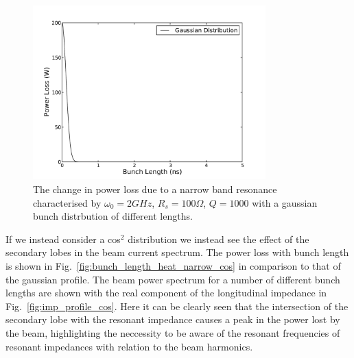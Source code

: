 \begin{figure}
\begin{center}
\includegraphics[width=0.8\textwidth]{Wakefields_and_Impedances/figures/heating_narrowband_gauss_bunch_length.pdf}
\end{center}
\label{fig:bunch_length_heat_narrow}
\caption{The change in power loss due to a narrow band resonance characterised by $\omega_{0} = 2GHz$, $R_{s} = 100\Omega$, $Q = 1000$ with a gaussian bunch distrbution of different lengths.}
\end{figure}

If we instead consider a cos$^{2}$ distribution we instead see the effect of the secondary lobes in the beam current spectrum. The power loss with bunch length is shown in Fig.~\ref{fig:bunch_length_heat_narrow_cos} in comparison to that of the gaussian profile. The beam power spectrum for a number of different bunch lengths are shown with the real component of the longitudinal impedance in Fig.~\ref{fig:imp_profile_cos}. Here it can be clearly seen that the intersection of the secondary lobe with the resonant impedance causes a peak in the power lost by the beam, highlighting the neccessity to be aware of the resonant frequencies of resonant impedances with relation to the beam harmonics.



